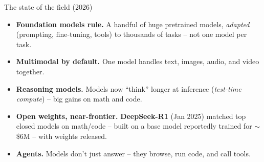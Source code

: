 \documentclass[aspectratio=43]{beamer}
\begin{document}
\begin{frame}{The state of the field (2026)}
  \begin{itemize}\small
    \item \textbf{Foundation models rule.} A handful of huge pretrained models, \emph{adapted}
      (prompting, fine-tuning, tools) to thousands of tasks -- not one model per task.
    \item \textbf{Multimodal by default.} One model handles text, images, audio, and video
      together.
    \item \textbf{Reasoning models.} Models now ``think'' longer at inference
      (\emph{test-time compute}) -- big gains on math and code.
    \item \textbf{Open weights, near-frontier.} \textbf{DeepSeek-R1} (Jan 2025) matched top
      closed models on math/code -- built on a base model reportedly trained for $\sim$\$6M --
      with weights released.
    \item \textbf{Agents.} Models don't just answer -- they browse, run code, and call tools.
  \end{itemize}
  \vfill
\end{frame}
\end{document}
